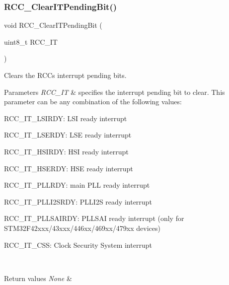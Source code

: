 \subsubsection{\texorpdfstring{R\+C\+C\+\_\+\+Clear\+I\+T\+Pending\+Bit()}{RCC\_ClearITPendingBit()}}
{\footnotesize\ttfamily void R\+C\+C\+\_\+\+Clear\+I\+T\+Pending\+Bit (\begin{DoxyParamCaption}\item[{uint8\+\_\+t}]{R\+C\+C\+\_\+\+IT }\end{DoxyParamCaption})}



Clears the R\+CC\textquotesingle{}s interrupt pending bits. 


\begin{DoxyParams}{Parameters}
{\em R\+C\+C\+\_\+\+IT} & specifies the interrupt pending bit to clear. This parameter can be any combination of the following values\+: \begin{DoxyItemize}
\item R\+C\+C\+\_\+\+I\+T\+\_\+\+L\+S\+I\+R\+DY\+: L\+SI ready interrupt \item R\+C\+C\+\_\+\+I\+T\+\_\+\+L\+S\+E\+R\+DY\+: L\+SE ready interrupt \item R\+C\+C\+\_\+\+I\+T\+\_\+\+H\+S\+I\+R\+DY\+: H\+SI ready interrupt \item R\+C\+C\+\_\+\+I\+T\+\_\+\+H\+S\+E\+R\+DY\+: H\+SE ready interrupt \item R\+C\+C\+\_\+\+I\+T\+\_\+\+P\+L\+L\+R\+DY\+: main P\+LL ready interrupt \item R\+C\+C\+\_\+\+I\+T\+\_\+\+P\+L\+L\+I2\+S\+R\+DY\+: P\+L\+L\+I2S ready interrupt ~\newline
 \item R\+C\+C\+\_\+\+I\+T\+\_\+\+P\+L\+L\+S\+A\+I\+R\+DY\+: P\+L\+L\+S\+AI ready interrupt (only for S\+T\+M32\+F42xxx/43xxx/446xx/469xx/479xx devices) \item R\+C\+C\+\_\+\+I\+T\+\_\+\+C\+SS\+: Clock Security System interrupt \end{DoxyItemize}
\\
\hline
\end{DoxyParams}

\begin{DoxyRetVals}{Return values}
{\em None} & \\
\hline
\end{DoxyRetVals}
\mbox{\label{group___r_c_c___group4_ga2897bdc52f272031c44fb1f72205d295}} 

